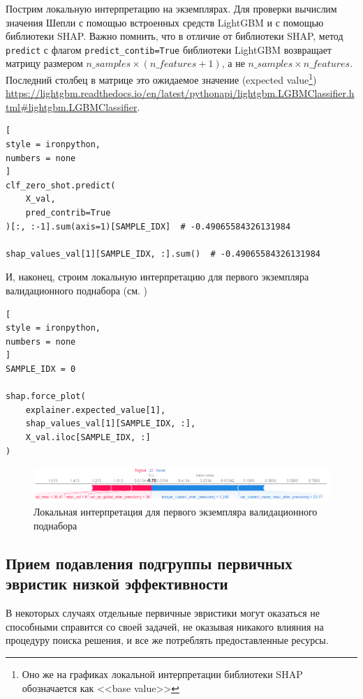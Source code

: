 \documentclass[%
	11pt,
	a4paper,
	utf8,
		]{article}
\begin{document}
Пострим локальную интерпретацию на экземплярах. Для проверки вычислим значения Шепли с помощью встроенных средств LightGBM и с помощью библиотеки SHAP. Важно помнить, что в отличие от библиотеки SHAP, метод \verb|predict| с флагом \verb|predict_contib=True| библиотеки LightGBM возвращает матрицу размером $ n\_samples \times (n\_features + 1) $, а не $ n\_samples \times n\_features $. Последний столбец в матрице это ожидаемое значение (expected value\footnote{Оно же  на графиках локальной интерпретации библиотеки SHAP обозначается как <<base value>>}) \url{https://lightgbm.readthedocs.io/en/latest/pythonapi/lightgbm.LGBMClassifier.html#lightgbm.LGBMClassifier}.
\begin{lstlisting}[
style = ironpython,
numbers = none
]
clf_zero_shot.predict(
    X_val,
    pred_contrib=True
)[:, :-1].sum(axis=1)[SAMPLE_IDX]  # -0.49065584326131984

shap_values_val[1][SAMPLE_IDX, :].sum()  # -0.49065584326131984
\end{lstlisting}

И, наконец, строим локальную интерпретацию для первого экземпляра валидационного поднабора (см. )
\begin{lstlisting}[
style = ironpython,
numbers = none
]
SAMPLE_IDX = 0

shap.force_plot(
    explainer.expected_value[1],
    shap_values_val[1][SAMPLE_IDX, :],
    X_val.iloc[SAMPLE_IDX, :]
)
\end{lstlisting}

\begin{figure}[h]
	\centering
	\includegraphics[scale=0.90]{figures/local_interpr_shap.png}
	\caption{ Локальная интерпретация для первого экземпляра валидационного поднабора }\label{fig:local_interpr_shap}
\end{figure}



\subsection{Прием подавления подгруппы первичных эвристик низкой эффективности}\label{sec:suh}

В некоторых случаях отдельные первичные эвристики могут оказаться не способными справится со своей задачей, не оказывая никакого влияния на процедуру поиска решения, и все же потреблять предоставленные ресурсы.
\end{document}
